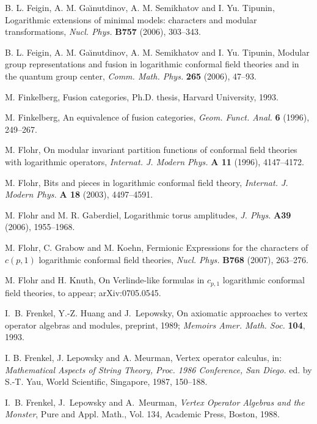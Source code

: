 \documentclass[12pt]{article}
\begin{document}
\begin{thebibliography}{FGST2}
B. L. Feigin, A. M. Ga{\u\i}nutdinov, 
A. M. Semikhatov and I. Yu. Tipunin,
Logarithmic extensions of minimal models: characters and modular
transformations, {\em Nucl. Phys.} {\bf B757} (2006), 303--343.

B. L. Feigin, A. M. Ga{\u\i}nutdinov, 
A. M. Semikhatov and I. Yu. Tipunin,
Modular group representations and fusion in logarithmic conformal
field theories and in the quantum group center, {\em Comm. Math.
Phys.} {\bf 265} (2006), 47--93.


M. Finkelberg, Fusion categories, Ph.D. thesis, Harvard University,
1993.

M. Finkelberg, An equivalence of fusion categories,
{\em Geom. Funct. Anal.} {\bf 6} (1996),
249--267.

 M. Flohr, On modular invariant partition functions
of conformal field theories with logarithmic operators, {\em
Internat. J. Modern Phys.} {\bf A 11} (1996), 4147--4172.

 M. Flohr, Bits and pieces in logarithmic conformal
field theory, {\em
Internat. J. Modern Phys.} {\bf A 18} (2003), 4497--4591.

M. Flohr and M. R. Gaberdiel, Logarithmic torus 
amplitudes, {\em J. Phys.} {\bf A39} (2006), 1955--1968.

M. Flohr, C. Grabow and M. Koehn,
Fermionic Expressions for the characters of $c(p,1)$
logarithmic conformal field theories, {\em Nucl. Phys.} {\bf B768} (2007), 
263--276.

M. Flohr and H. Knuth, On Verlinde-like formulas in $c_{p,1}$
logarithmic conformal field theories, to appear; arXiv:0705.0545.

I.~B. Frenkel, Y.-Z. Huang and J.~Lepowsky,
On axiomatic approaches to vertex operator algebras and modules,
preprint, 1989;
{\em Memoirs Amer. Math. Soc.} {\bf 104}, 1993.

 I. B. Frenkel, J. Lepowsky and A. Meurman,
Vertex operator calculus, in: {\em Mathematical Aspects of String
Theory, Proc. 1986 Conference, San Diego.} ed. by S.-T. Yau, World
Scientific, Singapore, 1987, 150--188.

I.~B. Frenkel, J.~Lepowsky and A.~Meurman,
{\em Vertex Operator Algebras and the Monster},
Pure and Appl. Math., Vol. 134,  Academic Press,  Boston, 1988.


\end{thebibliography}
\end{document}
